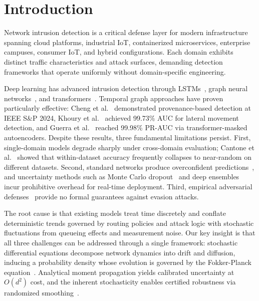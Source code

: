 \documentclass[journal]{IEEEtran}
\begin{document}
\section{Introduction}
\label{sec:introduction}

Network intrusion detection is a critical defense layer for modern infrastructure spanning cloud platforms, industrial IoT, containerized microservices, enterprise campuses, consumer IoT, and hybrid configurations. Each domain exhibits distinct traffic characteristics and attack surfaces, demanding detection frameworks that operate uniformly without domain-specific engineering.

Deep learning has advanced intrusion detection through LSTMs~\cite{kim2016lstm}, graph neural networks~\cite{kipf2017semi,velivckovic2018graph}, and transformers~\cite{vaswani2017attention}. Temporal graph approaches have proven particularly effective: Cheng et al.~\cite{cheng2024kairos} demonstrated provenance-based detection at IEEE S\&P 2024, Khoury et al.~\cite{khoury2024jbeil} achieved 99.73\% AUC for lateral movement detection, and Guerra et al.~\cite{guerra2025graphids} reached 99.98\% PR-AUC via transformer-masked autoencoders. Despite these results, three fundamental limitations persist. First, single-domain models degrade sharply under cross-domain evaluation; Cantone et al.~\cite{cantone2024crossdataset} showed that within-dataset accuracy frequently collapses to near-random on different datasets. Second, standard networks produce overconfident predictions~\cite{guo2017calibration}, and uncertainty methods such as Monte Carlo dropout~\cite{gal2016dropout} and deep ensembles~\cite{lakshminarayanan2017simple} incur prohibitive overhead for real-time deployment. Third, empirical adversarial defenses~\cite{madry2018towards} provide no formal guarantees against evasion attacks.

The root cause is that existing models treat time discretely and conflate deterministic trends governed by routing policies and attack logic with stochastic fluctuations from queueing effects and measurement noise. Our key insight is that all three challenges can be addressed through a single framework: stochastic differential equations decompose network dynamics into drift and diffusion, inducing a probability density whose evolution is governed by the Fokker-Planck equation~\cite{risken1989fpe}. Analytical moment propagation yields calibrated uncertainty at $O(d^2)$ cost, and the inherent stochasticity enables certified robustness via randomized smoothing~\cite{cohen2019certified}.
\end{document}
